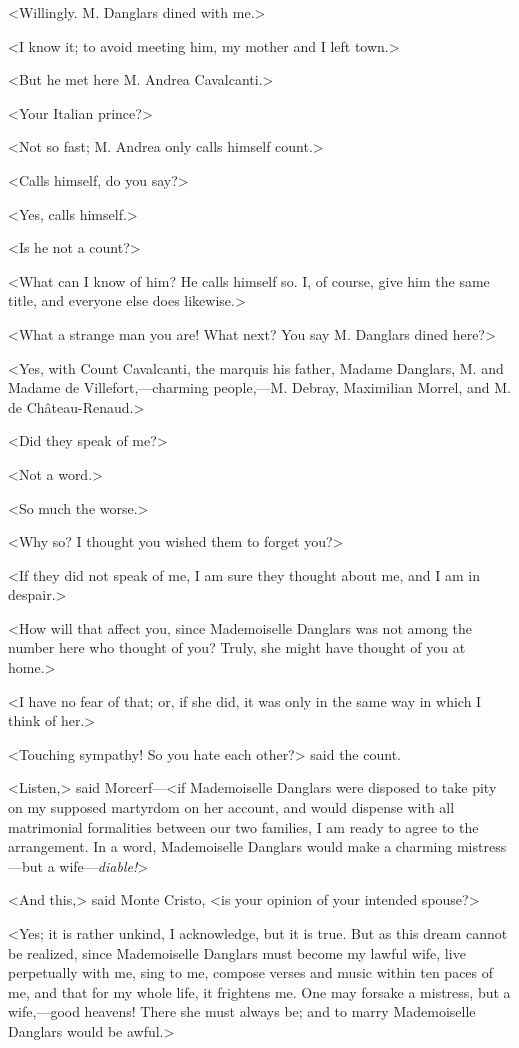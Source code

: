  <Willingly. M. Danglars dined with me.> 

 <I know it; to avoid meeting him, my mother and I left town.> 

 <But he met here M. Andrea Cavalcanti.> 

 <Your Italian prince?> 

 <Not so fast; M. Andrea only calls himself count.> 

 <Calls himself, do you say?> 

 <Yes, calls himself.> 

 <Is he not a count?> 

 <What can I know of him? He calls himself so. I, of course, give him the same title, and everyone else does likewise.> 

 <What a strange man you are! What next? You say M. Danglars dined here?> 

 <Yes, with Count Cavalcanti, the marquis his father, Madame Danglars, M. and Madame de Villefort,—charming people,—M. Debray, Maximilian Morrel, and M. de Château-Renaud.> 

 <Did they speak of me?> 

 <Not a word.> 

 <So much the worse.> 

 <Why so? I thought you wished them to forget you?> 

 <If they did not speak of me, I am sure they thought about me, and I am in despair.> 

 <How will that affect you, since Mademoiselle Danglars was not among the number here who thought of you? Truly, she might have thought of you at home.> 

 <I have no fear of that; or, if she did, it was only in the same way in which I think of her.> 

 <Touching sympathy! So you hate each other?> said the count. 

 <Listen,> said Morcerf—<if Mademoiselle Danglars were disposed to take pity on my supposed martyrdom on her account, and would dispense with all matrimonial formalities between our two families, I am ready to agree to the arrangement. In a word, Mademoiselle Danglars would make a charming mistress—but a wife—\textit{diable!}> 

 <And this,> said Monte Cristo, <is your opinion of your intended spouse?> 

 <Yes; it is rather unkind, I acknowledge, but it is true. But as this dream cannot be realized, since Mademoiselle Danglars must become my lawful wife, live perpetually with me, sing to me, compose verses and music within ten paces of me, and that for my whole life, it frightens me. One may forsake a mistress, but a wife,—good heavens! There she must always be; and to marry Mademoiselle Danglars would be awful.> 

